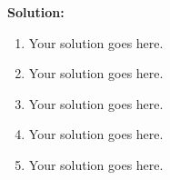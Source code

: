 \documentclass[]{article}
\newcommand{\solution}{\vskip 0.5cm \textbf{\large Solution:} \\}
\begin{document}
\begin{enumerate}[resume]
	\solution
	\begin{enumerate}
		\item Your solution goes here.
		\item Your solution goes here.
		\item Your solution goes here.
		\item Your solution goes here.
		\item Your solution goes here.
	\end{enumerate}
\end{enumerate}
\end{document}
